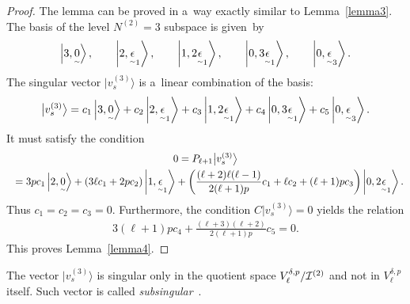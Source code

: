 \documentclass[11pt]{article}
\numberwithin{equation}{section}
\newcommand{\underaccent}[2]{\mathord{\underset{\smash{\scriptscriptstyle\sim}}{#2}}}
\def\ket#1{\left| #1\right\rangle}
\begin{document}
\begin{proof}
The lemma can be proved in a~way exactly similar to Lemma~\ref{lemma3}.
The basis of the level $ N^{(2)} = 3 $ subspace is given~by
\begin{gather*}
\ket{3,\underaccent{\tilde}{0}},
\qquad
\ket{2,\underaccent{\tilde}{\epsilon}_1},
\qquad
\ket{1,2\underaccent{\tilde}{\epsilon}_1},
\qquad
\ket{0,3\underaccent{\tilde}{\epsilon}_1},
\qquad
\ket{0,\underaccent{\tilde}{\epsilon}_3}.
\end{gather*}
The singular vector $ \big|v_s^{(3)}\big\rangle  $ is a~linear combination of the basis:
\begin{gather*}
\big|v_s^{(3)}\big\rangle  = c_1 \ket{3,\underaccent{\tilde}{0}} + c_2 \ket{2,\underaccent{\tilde}{\epsilon}_1} + c_3
\ket{1,2\underaccent{\tilde}{\epsilon}_1} + c_4 \ket{0,3\underaccent{\tilde}{\epsilon}_1} + c_5
\ket{0,\underaccent{\tilde}{\epsilon}_3}.
\end{gather*}
It must satisfy the condition
\begin{gather*}
0  =  P_{\ell+1} \big|v_s^{(3)}\big\rangle
\\
\hphantom{0}{}
 =  3 p c_1 \ket{2,\underaccent{\tilde}{0}} + (3\ell c_1 + 2p c_2) \ket{1,\underaccent{\tilde}{\epsilon}_1} +
\left(\frac{(\ell+2) \ell (\ell-1)}{2(\ell+1)p} c_1 + \ell c_2 + (\ell+1) p c_3 \right) \ket{0,
2\underaccent{\tilde}{\epsilon}_1}.
\end{gather*}
Thus $ c_1 = c_2 = c_3 = 0$.
Furthermore, the condition $ C \big|v_s^{(3)}\big\rangle  = 0 $ yields the relation
\begin{gather*}
3 (\ell+1) p c_4 + \frac{(\ell+3) (\ell+2)}{2(\ell+1)p} c_5 = 0.
\end{gather*}
This proves  Lemma~\ref{lemma4}.
\end{proof}

The vector $ \big|v_s^{(3)}\big\rangle  $ is singular only in the quotient space $ V^{\delta,p}_{\ell}/{\cal I}^{(2)} $ and not in
$ V^{\delta,p}_{\ell} $ itself.
Such vector is called \textit{subsingular}~\cite{Dob95,Dob97}.
\end{document}

